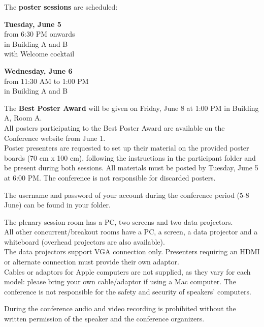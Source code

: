 
\noindent The \textbf{poster sessions} are scheduled:
\begin{center}
  \textbf{Tuesday, June 5} \\
  from 6:30 PM onwards \\
  in Building A and B\\
  with Welcome cocktail

  \bigskip
   
  \textbf{Wednesday, June 6} \\
  from 11:30 AM to 1:00 PM \\
  in Building A and B
\end{center}

\noindent The \textbf{Best Poster Award} will be given on Friday, June 8 at 1:00 PM in Building A, Room A.\\

\noindent All posters participating to the Best Poster Award are available on the Conference website from June 1.\\
Poster presenters are requested to set up
their material on the provided poster boards (70 cm x 100 cm), following the instructions in the participant folder and be present during both sessions.  
All materials must be posted by Tuesday, June 5 at 6:00 PM.
The conference is not responsible for discarded posters.

The username and password of your account during the conference period (5-8 June) can be found in your folder.

The plenary session room has a PC, two screens and two data projectors.\\ 
All other concurrent/breakout rooms have a PC, a screen, a data projector and a whiteboard (overhead projectors are also available).\\
The data projectors support VGA connection only. Presenters requiring an HDMI or alternate connection must provide their own adaptor.\\
Cables or adaptors for Apple computers are not supplied, as they vary for each model: please bring your own cable/adaptor if using a Mac computer. 
The conference is not responsible for the safety and security of speakers' computers.

During the conference audio and video recording is prohibited without the written permission of the speaker and the conference organizers.


